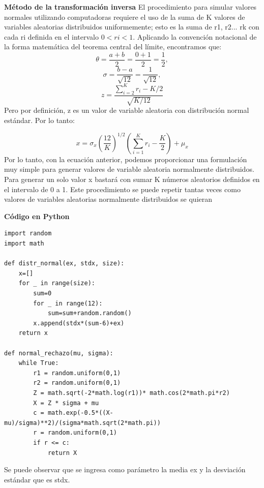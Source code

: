 \documentclass[11pt]{article}
\begin{document}
\noindent\textbf{Método de la transformación inversa\newline}
  El procedimiento para simular valores normales utilizando computadoras requiere el uso de la suma de K valores de
  variables aleatorias distribuidos uniformemente; esto es la suma de r1, r2... rk con cada ri definida en el intervalo $0 <  ri <  1$. Aplicando la convención notacional de la forma matemática del teorema central del límite, encontramos que:
  \begin{equation}
    \theta = \frac{a+b}{2} = \frac{0+1}{2} = \frac{1}{2},
  \end{equation}
  \begin{equation}
    \sigma = \frac{b-a}{\sqrt {12}} = \frac{1}{\sqrt {12}},
  \end{equation}
  \begin{equation}
    z = \frac{\sum_{i=2}^{K}r_{i}-K/2}{\sqrt {K/12}}
  \end{equation}
  Pero por definición, z es un valor de variable aleatoria con distribución normal estándar.
  Por lo tanto:

  \begin{equation}
    x = \sigma_{x}(\frac{12}{K})^{1/2}(\sum_{i=1}^{K}r_{i}-\frac{K}{2}) + \mu_{x}
  \end{equation}
  Por lo tanto, con la ecuación anterior, podemos proporcionar una formulación muy simple para generar valores de
  variable aleatoria normalmente distribuidos. Para generar un solo valor x bastará con sumar K números aleatorios
  definidos en el intervalo de 0 a 1. Este procedimiento se puede repetir tantas veces como valores de variables aleatorias
  normalmente distribuidos se quieran

\noindent\textbf{Código en Python}\\

\begin{lstlisting}
import random
import math

def distr_normal(ex, stdx, size):
    x=[]
    for _ in range(size):
        sum=0
        for _ in range(12):
            sum=sum+random.random()
        x.append(stdx*(sum-6)+ex)
    return x

def normal_rechazo(mu, sigma):
    while True:
        r1 = random.uniform(0,1)
        r2 = random.uniform(0,1)
        Z = math.sqrt(-2*math.log(r1))* math.cos(2*math.pi*r2)
        X = Z * sigma + mu 
        c = math.exp(-0.5*((X-mu)/sigma)**2)/(sigma*math.sqrt(2*math.pi))
        r = random.uniform(0,1)
        if r <= c:
            return X
\end{lstlisting}
Se puede observar que se ingresa como parámetro la media ex y la desviación estándar que es stdx.
\end{document}
